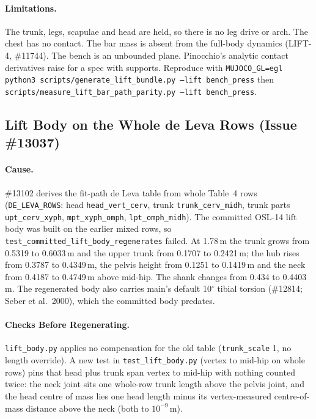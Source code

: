 \documentclass[11pt,a4paper]{article}
\begin{document}
\paragraph{Limitations.} The trunk, legs, scapulae and head are held, so
there is no leg drive or arch. The chest has no contact. The bar mass is
absent from the full-body dynamics (LIFT-4, \#11744). The bench is an
unbounded plane. Pinocchio's analytic contact derivatives raise for a spec
with supports. Reproduce with
\texttt{MUJOCO\_GL=egl python3 scripts/generate\_lift\_bundle.py --lift bench\_press}
then \texttt{scripts/measure\_lift\_bar\_path\_parity.py --lift bench\_press}.

\subsection{Lift Body on the Whole de Leva Rows (Issue \#13037)}\label{sec:whole-row-body}
\paragraph{Cause.} \#13102 derives the fit-path de Leva table from whole
Table~4 rows (\texttt{DE\_LEVA\_ROWS}: head \texttt{head\_vert\_cerv}, trunk
\texttt{trunk\_cerv\_midh}, trunk parts \texttt{upt\_cerv\_xyph},
\texttt{mpt\_xyph\_omph}, \texttt{lpt\_omph\_midh}). The committed OSL-14 lift
body was built on the earlier mixed rows, so
\texttt{test\_committed\_lift\_body\_regenerates} failed. At 1.78\,m the trunk
grows from 0.5319 to 0.6033\,m and the upper trunk from 0.1707 to 0.2421\,m;
the hub rises from 0.3787 to 0.4349\,m, the pelvis height from 0.1251 to
0.1419\,m and the neck from 0.4187 to 0.4749\,m above mid-hip. The shank
changes from 0.434 to 0.4403\,m. The regenerated body also carries main's
default 10$^\circ$ tibial torsion (\#12814; Seber et al.\ 2000), which the
committed body predates.

\paragraph{Checks Before Regenerating.} \texttt{lift\_body.py} applies no
compensation for the old table (\texttt{trunk\_scale} 1, no length
override). A new test in \texttt{test\_lift\_body.py} (vertex to
mid-hip on whole rows) pins that head plus trunk span vertex to mid-hip with
nothing counted twice: the neck joint sits one whole-row trunk length above the pelvis joint,
and the head centre of mass lies one head length minus its vertex-measured
centre-of-mass distance above the neck (both to $10^{-9}$\,m).
\end{document}
